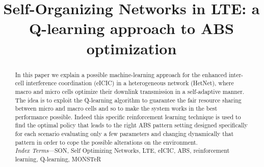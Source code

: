 \documentclass[conference,10pt]{IEEEtran}
\begin{document}
\title{Self-Organizing Networks	in LTE: a Q-learning approach to ABS optimization}

\author{
}

\maketitle

\begin{abstract}
In this paper we explain a possible machine-learning approach for the enhanced inter-cell interference coordination (eICIC) in a heterogeneous network (HetNet), where macro and micro cells optimize their downlink transmission in a self-adaptive manner. The idea is to exploit the Q-learning algorithm to guarantee the fair resource sharing between micro and macro cells and so to make the system works in the best performance possible. Indeed this specific reinforcement learning technique is used to find the optimal policy that leads to the right ABS pattern setting designed specifically for each scenario evaluating only a few parameters and changing dynamically that pattern in order to cope the possible alterations on the environment.\\

\textit{Index  Terms}---SON, Self Optimizing Networks, LTE, eICIC, ABS, reinforcement learning, Q-learning, MONSTeR     
\end{abstract}

\end{document}
